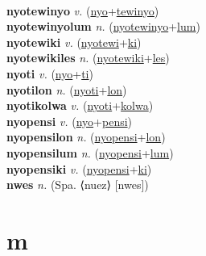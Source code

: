  \label{nyotewinu} \\
\textbf{nyotewinyo} \textit{v.} (\hyperref[nyo]{nyo}+\hyperref[tewinyo]{tewinyo})
 \label{nyotewinyo} \\
\textbf{nyotewinyolum} \textit{n.} (\hyperref[nyotewinyo]{nyotewinyo}+\hyperref[lum]{lum})
 \label{nyotewinyolum} \\
\textbf{nyotewiki} \textit{v.} (\hyperref[nyotewi]{nyotewi}+\hyperref[ki]{ki})
 \label{nyotewiki} \\
\textbf{nyotewikiles} \textit{n.} (\hyperref[nyotewiki]{nyotewiki}+\hyperref[les]{les})
 \label{nyotewikiles} \\
\textbf{nyoti} \textit{v.} (\hyperref[nyo]{nyo}+\hyperref[ti]{ti})
 \label{nyoti} \\
\textbf{nyotilon} \textit{n.} (\hyperref[nyoti]{nyoti}+\hyperref[lon]{lon})
 \label{nyotilon} \\
\textbf{nyotikolwa} \textit{v.} (\hyperref[nyoti]{nyoti}+\hyperref[kolwa]{kolwa})
 \label{nyotikolwa} \\
\textbf{nyopensi} \textit{v.} (\hyperref[nyo]{nyo}+\hyperref[pensi]{pensi})
 \label{nyopensi} \\
\textbf{nyopensilon} \textit{n.} (\hyperref[nyopensi]{nyopensi}+\hyperref[lon]{lon})
 \label{nyopensilon} \\
\textbf{nyopensilum} \textit{n.} (\hyperref[nyopensi]{nyopensi}+\hyperref[lum]{lum})
 \label{nyopensilum} \\
\textbf{nyopensiki} \textit{v.} (\hyperref[nyopensi]{nyopensi}+\hyperref[ki]{ki})
 \label{nyopensiki} \\
\textbf{nwes} \textit{n.} (Spa. ⟨nuez⟩ [nwes])
 \label{nwes} 

\section{m}

